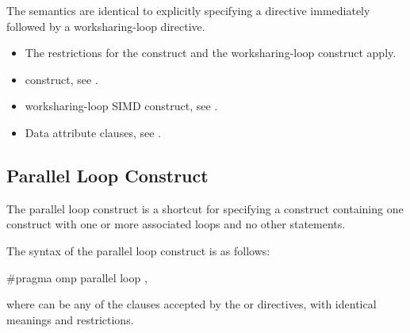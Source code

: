 \descr
The semantics are identical to explicitly specifying a  directive immediately
followed by a worksharing-loop directive.

\restrictions
\begin{itemize}
\item The restrictions for the  construct and the
    worksharing-loop construct apply.
\end{itemize}

\crossreferences
\begin{itemize}
\item {} construct, see
.

\item worksharing-loop SIMD construct, see
.

\item Data attribute clauses, see
.
\end{itemize}




\subsection{Parallel Loop Construct}
\label{subsec:Parallel Loop Construct}
\summary
The parallel loop construct is a shortcut for specifying a  construct
containing one  construct with one or more associated loops and no other statements.


\syntax
\begin{ccppspecific}
The syntax of the parallel loop construct is as follows:

\begin{ompcPragma}
#pragma omp parallel loop \plc{[clause[ [},\plc{] clause] ... ] new-line}
\end{ompcPragma}

where  can be any of the clauses accepted by the  or
   directives, with identical meanings and restrictions.
\end{ccppspecific}

